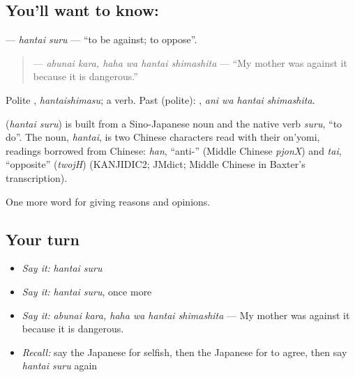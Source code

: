 \subsection*{You'll want to know: }
\textbf{} — \emph{hantai suru} — \textquotedblleft{}to be against; to oppose\textquotedblright{}.

\begin{quote}
\textbf{ } — \emph{abunai kara, haha wa hantai shimashita} — \textquotedblleft{}My mother was against it because it is dangerous.\textquotedblright{}
\end{quote}

Polite \textbf{}, \emph{hantaishimasu}; a  verb. Past (polite): \textbf{ }, \emph{ani wa hantai shimashita}.

\begin{cousinweb}
\textbf{} (\emph{hantai suru}) is built from a Sino-Japanese noun and the native verb \emph{suru}, \textquotedblleft{}to do\textquotedblright{}. The noun, \emph{hantai}, is two Chinese characters read with their on'yomi, readings borrowed from Chinese: \emph{han}, \textquotedblleft{}anti-\textquotedblright{} (Middle Chinese \emph{pjonX}) and \emph{tai}, \textquotedblleft{}opposite\textquotedblright{} (\emph{twojH}) (KANJIDIC2; JMdict; Middle Chinese in Baxter's transcription).
\end{cousinweb}

\begin{grammarlens}[title={What you've built}]
One more word for giving reasons and opinions.
\end{grammarlens}

\subsection*{Your turn}
\begin{itemize}
\raggedright
  \item \emph{Say it:} \emph{hantai suru}
  \item \emph{Say it:} \emph{hantai suru}, once more
  \item \emph{Say it:} \emph{abunai kara, haha wa hantai shimashita} — My mother was against it because it is dangerous.
  \item \emph{Recall:} say the Japanese for selfish, then the Japanese for to agree, then say \emph{hantai suru} again
\end{itemize}

